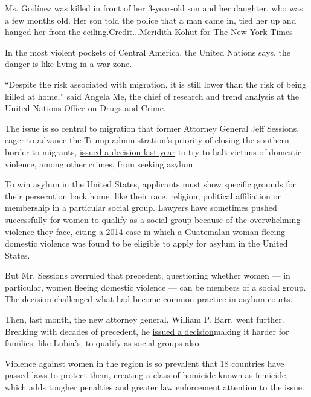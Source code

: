 Ms. Godínez was killed in front of her 3-year-old son and her daughter,
who was a few months old. Her son told the police that a man came in,
tied her up and hanged her from the ceiling.Credit...Meridith Kohut for
The New York Times

In the most violent pockets of Central America, the United Nations says,
the danger is like living in a war zone.

``Despite the risk associated with migration, it is still lower than the
risk of being killed at home,'' said Angela Me, the chief of research
and trend analysis at the United Nations Office on Drugs and Crime.

The issue is so central to migration that former Attorney General Jeff
Sessions, eager to advance the Trump administration's priority of
closing the southern border to migrants,
\href{https://www.nytimes3xbfgragh.onion/2018/06/11/us/politics/sessions-domestic-violence-asylum.html}{issued
a decision last year} to try to halt victims of domestic violence, among
other crimes, from seeking asylum.

To win asylum in the United States, applicants must show specific
grounds for their persecution back home, like their race, religion,
political affiliation or membership in a particular social group.
Lawyers have sometimes pushed successfully for women to qualify as a
social group because of the overwhelming violence they face, citing
\href{https://www.nytimes3xbfgragh.onion/2014/08/30/us/victim-of-domestic-violence-in-guatemala-is-ruled-eligible-for-asylum-in-us.html}{a
2014 case} in which a Guatemalan woman fleeing domestic violence was
found to be eligible to apply for asylum in the United States.

But Mr. Sessions overruled that precedent, questioning whether women ---
in particular, women fleeing domestic violence --- can be members of a
social group. The decision challenged what had become common practice in
asylum courts.

Then, last month, the new attorney general, William P. Barr, went
further. Breaking with decades of precedent, he
\href{https://www.nytimes3xbfgragh.onion/2019/07/29/world/americas/justice-department-asylum-families.html}{issued
a decision}making it harder for families, like Lubia's, to qualify as
social groups also.

Violence against women in the region is so prevalent that 18 countries
have passed laws to protect them, creating a class of homicide known as
femicide, which adds tougher penalties and greater law enforcement
attention to the issue.

